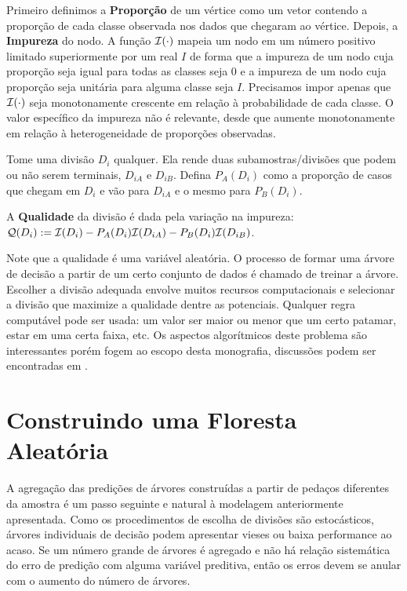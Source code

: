 Primeiro definimos a \textbf{Proporção} de um vértice como um vetor contendo a proporção de cada classe observada nos dados que chegaram ao vértice. Depois, a \textbf{Impureza} do nodo. A função $\mathcal{I}(\cdot)$ mapeia um nodo em um número positivo limitado superiormente por um real $I$ de forma que a impureza de um nodo cuja proporção seja igual para todas as classes seja $0$ e a impureza de um nodo cuja proporção seja unitária para alguma classe seja $I$. Precisamos impor apenas que $\mathcal{I}(\cdot)$ seja monotonamente crescente em relação à probabilidade de cada classe. O valor específico da impureza não é relevante, desde que aumente monotonamente em relação à heterogeneidade de proporções observadas.

Tome uma divisão $D_i$ qualquer. Ela rende duas subamostras/divisões que podem ou não serem terminais, $D_{iA}$ e $D_{iB}$. Defina $P_A (D_i)$ como a proporção de casos que chegam em $D_i$ e vão para $D_{iA}$ e o mesmo para $P_B (D_i)$.

\begin{defi}
A \textbf{Qualidade} da divisão é dada pela variação na impureza: $\mathcal{Q} (D_i) := \mathcal{I}(D_i) - P_A(D_i) \mathcal{I} (D_{iA}) - P_B(D_i) \mathcal{I} (D_{iB})$.
\end{defi}

Note que a qualidade é uma variável aleatória. O processo de formar uma árvore de decisão a partir de um certo conjunto de dados é chamado de treinar a árvore. Escolher a divisão adequada envolve muitos recursos computacionais e selecionar a divisão que maximize a qualidade dentre as potenciais. Qualquer regra computável pode ser usada: um valor ser maior ou menor que um certo patamar, estar em uma certa faixa, etc. Os aspectos algorítmicos deste problema são interessantes porém fogem ao escopo desta monografia, discussões podem ser encontradas em .
 
 \section{Construindo uma Floresta Aleatória}
 
 A agregação das predições de árvores construídas a partir de pedaços diferentes da amostra é um passo seguinte e natural à modelagem anteriormente apresentada. Como os procedimentos de escolha de divisões são estocásticos, árvores individuais de decisão podem apresentar vieses ou baixa performance ao acaso. Se um número grande de árvores é agregado e não há relação sistemática do erro de predição com alguma variável preditiva, então os erros devem se anular com o aumento do número de árvores.
 
